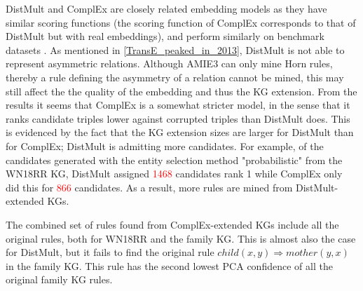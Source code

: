 DistMult and ComplEx are closely related embedding models as they have similar scoring functions (the scoring function of ComplEx corresponds to that of DistMult but with real embeddings), and perform similarly on benchmark datasets \cite{complEx}. As mentioned in \cref{TransE_peaked_in_2013}, DistMult is not able to represent asymmetric relations. Although AMIE3 can only mine Horn rules, thereby a rule defining the asymmetry of a relation cannot be mined, this may still affect the the quality of the embedding and thus the KG extension. From the results it seems that ComplEx is a somewhat stricter model, in the sense that it ranks candidate triples lower against corrupted triples than DistMult does. This is evidenced by the fact that the KG extension sizes are larger for DistMult than for ComplEx; DistMult is admitting more candidates. For example, of the candidates generated with the entity selection method "probabilistic" from the WN18RR KG, DistMult assigned \textcolor{red}{1468} candidates rank 1 while ComplEx only did this for \textcolor{red}{866} candidates. As a result, more rules are mined from DistMult-extended KGs.

The combined set of rules found from ComplEx-extended KGs include all the original rules, both for WN18RR and the family KG.  This is almost also the case for DistMult, but it fails to find the original rule $child(x, y) \Rightarrow mother(y,x)$ in the family KG. This rule has the second lowest PCA confidence of all the original family KG rules.

